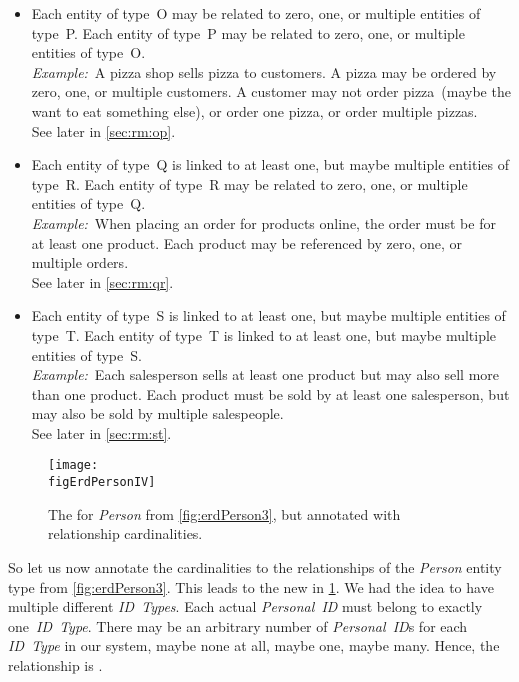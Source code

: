 \begin{itemize}
%
\item {}
Each entity of type~O may be related to zero, one, or multiple entities of type~P.
Each entity of type~P may be related to zero, one, or multiple entities of type~O.\\%
\emph{Example:}~A pizza shop sells pizza to customers.
A pizza may be ordered by zero, one, or multiple customers.
A customer may not order pizza~(maybe the want to eat something else), or order one pizza, or order multiple pizzas.~\cite{FCC2016D:CFNRSAHTRD}\\%
See later in \cref{sec:rm:op}.%
%
\item {}
Each entity of type~Q is linked to at least one, but maybe multiple entities of type~R.
Each entity of type~R may be related to zero, one, or multiple entities of type~Q.~\cite{BS2023G:CFNIERD}\\%
\emph{Example:}~When placing an order for products online, the order must be for at least one product.
Each product may be referenced by zero, one, or multiple orders.~\cite{BS2023G:CFNIERD}\\%
See later in \cref{sec:rm:qr}.%
%
\item {}
Each entity of type~S is linked to at least one, but maybe multiple entities of type~T.
Each entity of type~T is linked to at least one, but maybe multiple entities of type~S.~\cite{T2025CDBMS:ERM}\\%
\emph{Example:}~Each salesperson sells at least one product but may also sell more than one product.
Each product must be sold by at least one salesperson, but may also be sold by multiple salespeople.~\cite{T2025CDBMS:ERM}\\%
See later in \cref{sec:rm:st}.%
%
\end{itemize}%
%
\FloatBarrier%
%
\begin{figure}%
\centering%
\xdef\figErdPersonIV{\currentDir/erdPerson4}%
\texttt{[image: \\figErdPersonIV]}%
\caption{The  for \emph{Person} from \cref{fig:erdPerson3}, but annotated with relationship cardinalities.}%
\label{fig:erdPerson4}%
\end{figure}%

So let us now annotate the cardinalities to the relationships of the \emph{Person} entity type from \cref{fig:erdPerson3}.
This leads to the new  in \cref{fig:erdPerson4}.
We had the idea to have multiple different \emph{ID~Types}.
Each actual \emph{Personal~ID} must belong to exactly one~\emph{ID~Type}.
There may be an arbitrary number of \emph{Personal~ID}s for each \emph{ID~Type} in our system, maybe none at all, maybe one, maybe many.
Hence, the relationship is .

